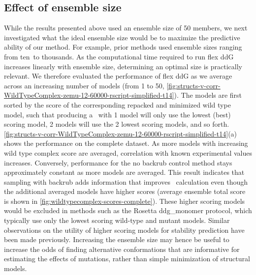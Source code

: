 \subsection{Effect of ensemble size}

While the results presented above used an ensemble size of 50 members, we next investigated what the ideal ensemble size would be to maximize the predictive ability of our method.
For example, prior methods used ensemble sizes ranging from ten\cite{kamisetty_accounting_2011}\ to thousands\cite{benedix_predicting_2009}. As the computational time required to run flex ddG increases linearly with ensemble size, determining an optimal size is practically relevant. We therefore evaluated the performance of flex ddG as we average across an increasing number of models (from 1 to 50, \cref{fig:structs-v-corr-WildTypeComplex-zemu-12-60000-rscript-simplified-t14}).
The models are first sorted by the score of the corresponding repacked and minimized wild type model, such that producing a \ddg\ with 1 model will only use the lowest (best) scoring model, 2 models will use the 2 lowest scoring models, and so forth.
\cref{fig:structs-v-corr-WildTypeComplex-zemu-12-60000-rscript-simplified-t14}(a) shows the performance on the complete dataset.
As more models with increasing wild type complex score are averaged, correlation with known experimental values increases.
Conversely, performance for the no backrub control method stays approximately constant as more models are averaged.
This result indicates that sampling with backrub adds information that improves \ddg\ calculation even though the additional averaged models have higher scores (average ensemble total score is shown in \cref{fig:wildtypecomplex-scores-complete}).
These higher scoring models would be excluded in methods such as the Rosetta ddg\_monomer protocol, which typically use only the lowest scoring wild-type and mutant models.
Similar observations on the utility of higher scoring models for stability prediction have been made previously\cite{howell_understanding_2014,davey_optimization_2015}.
Increasing the ensemble size may hence be useful to increase the odds of finding alternative conformations that are informative for estimating the effects of mutations, rather than simple minimization of structural models.


